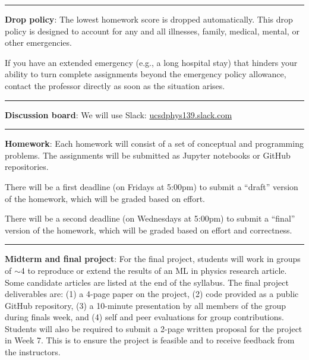 \documentclass[12pt]{article}
\begin{document}
\begin{center}
	\rule{\textwidth}{0.5pt}
\end{center}

\noindent\textbf{Drop policy}: The lowest homework score is dropped automatically.
This drop policy is designed to account for any and all illnesses, family, medical, mental, or other emergencies.

If you have an extended emergency (e.g., a long hospital stay) that hinders your ability to turn complete assignments beyond the emergency policy allowance, contact the professor directly as soon as the situation arises.

\begin{center}
	\rule{\textwidth}{0.5pt}
\end{center}

\noindent\textbf{Discussion board}: We will use Slack: \href{https://join.slack.com/t/ucsdphys139/shared\_invite/zt-110gwd4lx-pZBsItfcxhbOD5BV6afVDA}{ucsdphys139.slack.com}

\begin{center}
	\rule{\textwidth}{0.5pt}
\end{center}

\noindent\textbf{Homework}: Each homework will consist of a set of conceptual and programming problems.
The assignments will be submitted as Jupyter notebooks or GitHub repositories.

There will be a first deadline (on Fridays at 5:00pm) to submit a ``draft'' version of the homework, which will be graded based on effort.

There will be a second deadline (on Wednesdays at 5:00pm) to submit a ``final'' version of the homework, which will be graded based on effort and correctness.

\begin{center}
	\rule{\textwidth}{0.5pt}
\end{center}

\noindent\textbf{Midterm and final project}:
For the final project, students will work in groups of $\sim$4 to reproduce or extend the results of an ML in physics research article.
Some candidate articles are listed at the end of the syllabus.
The final project deliverables are: (1) a 4-page paper on the project, (2) code provided as a public GitHub repository, (3) a 10-minute presentation by all members of the group during finals week, and (4) self and peer evaluations for group contributions.
Students will also be required to submit a 2-page written proposal for the project in Week 7.
This is to ensure the project is feasible and to receive feedback from the instructors.
\end{document}

